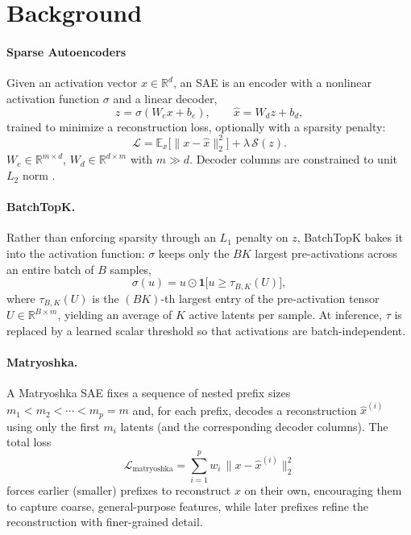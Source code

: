 \documentclass{article}
\begin{document}
\section{Background}

\paragraph{Sparse Autoencoders}
\label{sec:background}
Given an activation vector $x \in \mathbb{R}^{d}$, an SAE is an encoder
with a nonlinear activation function $\sigma$ and a linear decoder,
\begin{equation}
    z = \sigma(W_e x + b_e), \qquad \hat{x} = W_d z + b_d,
\end{equation}
trained to minimize a reconstruction loss, optionally with a sparsity penalty:
\begin{equation}
    \mathcal{L} = \mathbb{E}_x \big[\|x - \hat{x}\|_2^2\big] + \lambda \, \mathcal{S}(z).
\end{equation}
$W_e \in \mathbb{R}^{m \times d}$, $W_d \in \mathbb{R}^{d \times m}$ with $m \gg d$. Decoder columns are constrained to unit $L_2$ norm \cite{bricken2023monosemanticity}.

\paragraph{BatchTopK.} Rather than enforcing sparsity through an $L_1$ penalty on $z$, BatchTopK \cite{bussmann2024batchtopk} bakes it into the activation function: $\sigma$ keeps only the $BK$ largest pre-activations across an entire batch of $B$ samples,
\begin{equation}
    \sigma(u) = u \odot \mathbf{1}\!\big[u \geq \tau_{B,K}(U)\big],
\end{equation}
where $\tau_{B,K}(U)$ is the $(BK)$-th largest entry of the pre-activation tensor $U \in \mathbb{R}^{B \times m}$, yielding an average of $K$ active latents per sample. At inference, $\tau$ is replaced by a learned scalar threshold so that activations are batch-independent.

\paragraph{Matryoshka.} A Matryoshka SAE \cite{bussmann2025matryoshka} fixes a sequence of nested prefix sizes $m_1 < m_2 < \cdots < m_p = m$ and, for each prefix, decodes a reconstruction $\hat{x}^{(i)}$ using only the first $m_i$ latents (and the corresponding decoder columns). The total loss
\begin{equation}
    \mathcal{L}_{\text{matryoshka}} = \sum_{i=1}^{p} w_i \, \big\|x - \hat{x}^{(i)}\big\|_2^2
\end{equation}
forces earlier (smaller) prefixes to reconstruct $x$ on their own, encouraging them to capture coarse, general-purpose features, while later prefixes refine the reconstruction with finer-grained detail.
\end{document}

